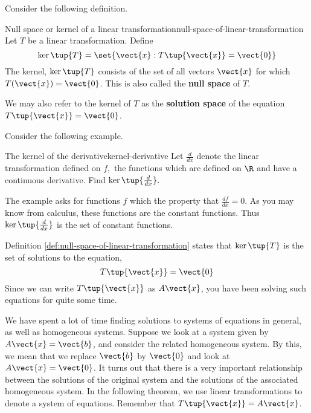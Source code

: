 Consider the following definition.

\begin{definition}{Null space or kernel of a linear transformation}{null-space-of-linear-transformation}
Let $T$ be a linear transformation. Define
\begin{equation*}
\ker \tup{T} = \set{\vect{x}:T \tup{\vect{x} }= \vect{0} } 
\end{equation*}
The kernel, $\ker \tup{T} $ consists of the set of all vectors $\vect{x}$ for which
$T (\vect{x}) = \vect{0}$. This is also called the
\textbf{null space} of $T$. 
\end{definition}

We may also refer to the kernel of $T$ as the
\textbf{solution space} of the equation $T \tup{\vect{x}} = \vect{0}$.


Consider the following example.

\begin{example}{The kernel of the derivative}{kernel-derivative}
Let $\frac{d}{dx}$ denote the linear transformation defined on $f,$ the functions
which are defined on $\R$ and have a continuous derivative. Find 
$\ker \tup{\frac{d}{dx}} .$
\end{example}

\begin{solution} The example asks for functions $f$ which the property that $\frac{df}{dx}
=0. $ As you may know from calculus, these functions are the constant functions.
Thus $\ker \tup{\frac{d}{dx}}$ is the set of constant functions.
\end{solution} 

Definition \ref{def:null-space-of-linear-transformation} states that $\ker \tup{T} $ is the set of
solutions to the equation,
\begin{equation*}
T\tup{\vect{x} } = \vect{0}
\end{equation*}
Since we can write $T\tup{\vect{x} }$ as $A\vect{x}$, you have been solving such
equations for quite some time.

We have spent a lot of time finding solutions to systems of equations in general, as well as
homogeneous systems. Suppose we look at a system given by $A\vect{x}=\vect{b}$, and consider the 
related homogeneous system. By this, we mean that we replace $\vect{b}$ by $\vect{0}$ and look at $A\vect{x}=\vect{0}$. 
It turns out that there is a very important relationship between the solutions of the original
system and the solutions of the associated homogeneous system. In the following 
theorem, we use linear transformations to denote a system of equations. Remember that
$T\tup{\vect{x}} = A\vect{x}$.


